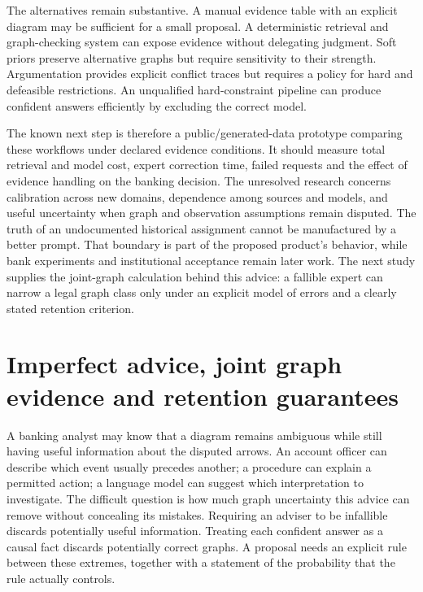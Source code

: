 The alternatives remain substantive. A manual evidence table with an
explicit diagram may be sufficient for a small proposal. A deterministic
retrieval and graph-checking system can expose evidence without
delegating judgment. Soft priors preserve alternative graphs but require
sensitivity to their strength. Argumentation provides explicit conflict
traces but requires a policy for hard and defeasible restrictions. An
unqualified hard-constraint pipeline can produce confident answers
efficiently by excluding the correct model.

The known next step is therefore a public/generated-data prototype
comparing these workflows under declared evidence conditions. It should
measure total retrieval and model cost, expert correction time, failed
requests and the effect of evidence handling on the banking decision.
The unresolved research concerns calibration across new domains,
dependence among sources and models, and useful uncertainty when graph
and observation assumptions remain disputed. The truth of an
undocumented historical assignment cannot be manufactured by a better
prompt. That boundary is part of the proposed product's behavior, while
bank experiments and institutional acceptance remain later work.
The next study supplies the joint-graph calculation behind this advice: a
fallible expert can narrow a legal graph class only under an explicit model
of errors and a clearly stated retention criterion.

\label{exec14:expert-evidence-end}


\section{Imperfect advice, joint graph evidence and retention guarantees}
\label{exec17:advice-development}

A banking analyst may know that a diagram remains ambiguous while still
having useful information about the disputed arrows. An account officer can
describe which event usually precedes another; a procedure can explain a
permitted action; a language model can suggest which interpretation to
investigate. The difficult question is how much graph uncertainty this advice
can remove without concealing its mistakes. Requiring an adviser to be
infallible discards potentially useful information. Treating each confident
answer as a causal fact discards potentially correct graphs. A proposal needs
an explicit rule between these extremes, together with a statement of the
probability that the rule actually controls.

